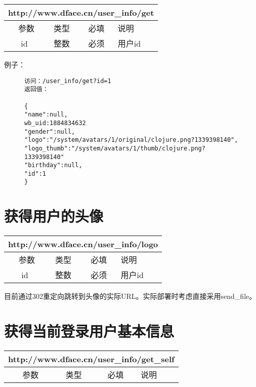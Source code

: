 \documentclass[cs4size]{ctexartutf8}
\begin{document}
\begin{table}[H]
   \begin{center}
\begin{tabular}{|c|c|c|p{12cm}|}
\hline
\multicolumn{4}{|c|}{http://www.dface.cn/user\_info/get} \\
\hline\hline
 \  参数  & 类型 & 必填 &  说明  \\
\hline
 id  & 整数 & 必须 &  用户id\\
\hline
\end{tabular}
   \end{center}
\end{table}


例子：

\begin{figure}[H]
\begin{verbatim}
访问：/user_info/get?id=1
返回值：

{
"name":null,
wb_uid:1884834632
"gender":null,
"logo":"/system/avatars/1/original/clojure.png?1339398140",
"logo_thumb":"/system/avatars/1/thumb/clojure.png?1339398140"
"birthday":null,
"id":1
}

\end{verbatim}
\end{figure}


\section{获得用户的头像}

\begin{table}[H]
   \begin{center}
\begin{tabular}{|c|c|c|p{12cm}|}
\hline
\multicolumn{4}{|c|}{http://www.dface.cn/user\_info/logo} \\
\hline\hline
 \  参数  & 类型 & 必填 &  说明  \\
\hline
 id  & 整数 & 必须 &  用户id\\
\hline
\end{tabular}
   \end{center}
\end{table}

目前通过302重定向跳转到头像的实际URL。实际部署时考虑直接采用send\_file。



\section{获得当前登录用户基本信息}

\begin{table}[H]
   \begin{center}
\begin{tabular}{|c|c|c|p{12cm}|}
\hline
\multicolumn{4}{|c|}{http://www.dface.cn/user\_info/get\_self} \\
\hline\hline
 \  参数  & 类型 & 必填 &  说明  \\
\hline
\end{tabular}
   \end{center}
\end{table}
\end{document}

